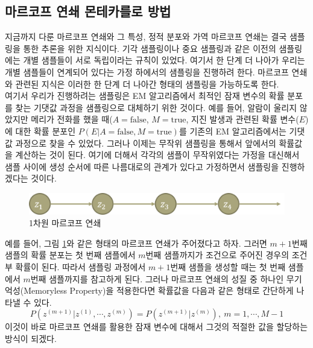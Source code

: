 \documentclass[a4paper]{oblivoir}
\begin{document}
\subsection{마르코프 연쇄 몬테카를로 방법}

지금까지 다룬 마르코프 연쇄와 그 특성, 정적 분포와 가역 마르코프 연쇄는 결국 샘플링을 통한 추론을 위한 지식이다. 기각 샘플링이나 중요 샘플링과 같은 이전의 샘플링에는 개별 샘플들이 서로 독립이라는 규칙이 있었다. 여기서 한 단계 더 나아가 우리는 개별 샘플들이 연계되어 있다는 가정 하에서의 샘플링을 진행하려 한다. 마르코프 연쇄와 관련된 지식은 이러한 한 단계 더 나아간 형태의 샘플링을 가능하도록 한다.   \\

여기서 우리가 진행하려는 샘플링은 EM 알고리즘에서 최적인 잠재 변수의 확률 분포를 찾는 기댓값 과정을 샘플링으로 대체하기 위한 것이다. 예를 들어, 알람이 울리지 않았지만 메리가 전화를 했을 때($A = \textrm{false}$, $M = \textrm{true}$, 지진 발생과 관련된 확률 변수($E$)에 대한 확률 분포인 $P(E|A = \textrm{false}, M = \textrm{true})$를 기존의 EM 알고리즘에서는 기댓값 과정으로 찾을 수 있었다. 그러나 이제는 무작위 샘플링을 통해서 앞에서의 확률값을 계산하는 것이 된다. 여기에 더해서 각각의 샘플이 무작위였다는 가정을 대신해서 샘플 사이에 생성 순서에 따른 나름대로의 관계가 있다고 가정하면서 샘플링을 진행하겠다는 것이다.  \\

\begin{figure}[ht] \centering 
\includegraphics[scale=0.6]{fig10_9.png} 
\caption{1차원 마르코프 연쇄}
\label{fig:10-9}
\end{figure}  

예를 들어, 그림 \ref{fig:10-9}와 같은 형태의 마르코프 연쇄가 주어졌다고 하자. 그러면 $m+1$번째 샘플의 확률 분포는 첫 번째 샘플에서 $m$번째 샘플까지가 조건으로 주어진 경우의 조건부 확률이 된다. 따라서 샘플링 과정에서 $m+1$번째 샘플을 생성할 때는 첫 번째 샘플에서 $m$번째 샘플까지를 참고하게 된다. 그러나 마르코프 연쇄의 성질 중 하나인 무기억성(Memoryless Property)을 적용한다면 확률값을 다음과 같은 형태로 간단하게 나타낼 수 있다. 
\begin{equation}
P(z^{(m+1)} | z^{(1)},\cdots,z^{(m)}) = P(z^{(m+1)} | z^{(m)}), \ m=1,\cdots,M-1
\label{eq:10-12}
\end{equation} 
이것이 바로 마르코프 연쇄를 활용한 잠재 변수에 대해서 그것의 적절한 값을 할당하는 방식이 되겠다.  \\
\end{document}
